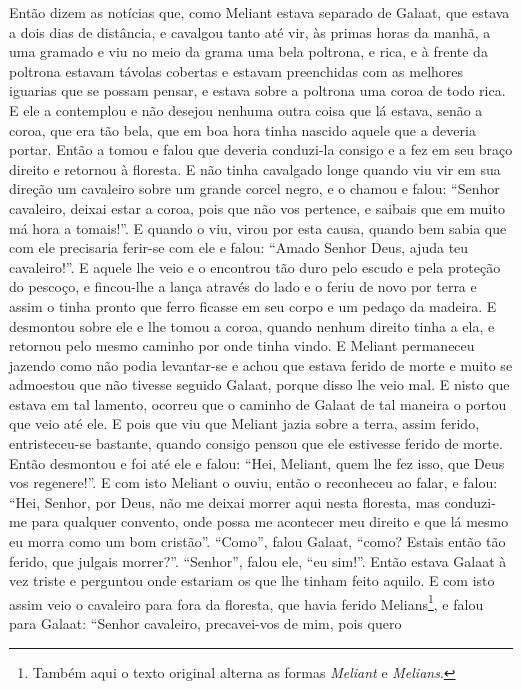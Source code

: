 Então dizem as notícias que, como Meliant estava separado de Galaat, que estava
a dois dias de distância, e cavalgou tanto até vir, às primas horas da manhã, a
uma gramado e viu no meio da grama uma bela poltrona, e rica, e à frente da
poltrona estavam távolas cobertas e estavam preenchidas com as melhores
iguarias que se possam pensar, e estava sobre a poltrona uma coroa de todo
rica. E ele a contemplou e não desejou nenhuma outra coisa que lá estava, senão
a coroa, que era tão bela, que em boa hora tinha nascido aquele que a deveria
portar. Então a tomou e falou que deveria conduzi-la consigo e a fez em seu
braço direito e retornou à floresta. E não tinha cavalgado longe quando viu vir
em sua direção um cavaleiro sobre um grande corcel negro, e o chamou e falou:
“Senhor cavaleiro, deixai estar a coroa, pois que não vos pertence, e saibais
que em muito má hora a tomais!”. E quando o viu, virou por esta causa, quando
bem sabia que com ele precisaria ferir-se com ele e falou: “Amado Senhor Deus,
ajuda teu cavaleiro!”. E aquele lhe veio e o encontrou tão duro pelo escudo e
pela proteção do pescoço, e fincou-lhe a lança através do lado e o feriu de
novo por terra e assim o tinha pronto que ferro ficasse em seu corpo e um
pedaço da madeira. E desmontou sobre ele e lhe tomou a coroa, quando nenhum
direito tinha a ela, e retornou pelo mesmo caminho por onde tinha vindo. 
E Meliant permaneceu jazendo como não podia levantar-se e achou que estava
ferido de morte e muito se admoestou que não tivesse seguido Galaat, porque
disso lhe veio mal. E nisto que estava em tal lamento, ocorreu que o caminho de
Galaat de tal maneira o portou que veio até ele. E pois que viu que Meliant
jazia sobre a terra, assim ferido, entristeceu-se bastante, quando consigo
pensou que ele estivesse ferido de morte. Então desmontou e foi até ele e
falou: “Hei, Meliant, quem lhe fez isso, que Deus vos regenere!”. E com isto
Meliant o ouviu, então o reconheceu ao falar, e falou: “Hei, Senhor, por Deus,
não me deixai morrer aqui nesta floresta, mas conduzi-me para qualquer
convento, onde possa me acontecer meu direito e que lá mesmo eu morra como um
bom cristão”. “Como”, falou Galaat, “como? Estais então tão ferido, que julgais
morrer?”. “Senhor”, falou ele, “eu sim!”. Então estava Galaat à vez triste e
perguntou onde estariam os que lhe tinham feito aquilo. E com isto assim veio o
cavaleiro para fora da floresta, que havia ferido Melians\footnote{ Também aqui
o texto original alterna as formas \textit{Meliant} e \textit{Melians}.
 }, e falou para Galaat: “Senhor cavaleiro, precavei-vos de mim, pois quero
